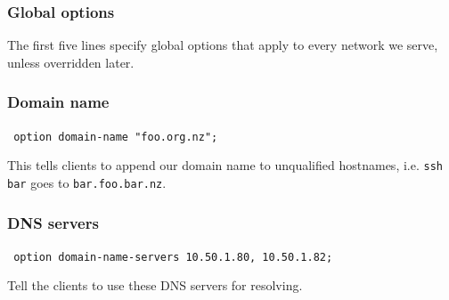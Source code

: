 \documentclass[10pt]{beamer}
\begin{document}
\begin{frame}
	\frametitle{Global options}
	The first five lines specify global options that apply to every network
	we serve, unless overridden later.
\end{frame}
\begin{frame}
	\frametitle{Domain name}
	
	\texttt{ option domain-name "foo.org.nz"; }
	
	\vspace{5mm}
	This tells clients to append our domain name to unqualified hostnames, 
	i.e.  \texttt{ssh bar} goes to \texttt{bar.foo.bar.nz}.
\end{frame}
\begin{frame}
	\frametitle{DNS servers}
	
	\texttt{ option domain-name-servers 10.50.1.80, 10.50.1.82; }
	
	\vspace{5mm}
	Tell the clients to use these DNS servers for resolving.
	
\end{frame}
\end{document}
